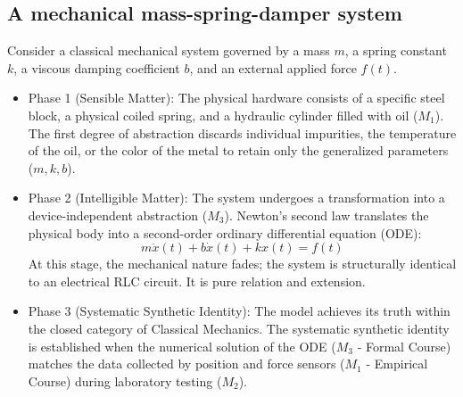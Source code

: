 \documentclass[11pt, a4paper]{article}
\begin{document}
\subsection{A mechanical mass-spring-damper system}
Consider a classical mechanical system governed by a mass $m$, a spring constant $k$, a viscous damping coefficient $b$, and an external applied force $f(t)$.
\begin{itemize}
\item \textrm{Phase 1 (Sensible Matter):} The physical hardware consists of a specific steel block, a physical coiled spring, and a hydraulic cylinder filled with oil ($M_1$). The first degree of abstraction discards individual impurities, the temperature of the oil, or the color of the metal to retain only the generalized parameters ($m, k, b$).
\item \textrm{Phase 2 (Intelligible Matter):} The system undergoes a transformation into a device-independent abstraction ($M_3$). Newton's second law translates the physical body into a second-order ordinary differential equation (ODE):
\begin{equation}
m\ddot{x}(t) + b\dot{x}(t) + kx(t) = f(t)
\end{equation}
At this stage, the mechanical nature fades; the system is structurally identical to an electrical RLC circuit. It is pure relation and extension.
\item \textrm{Phase 3 (Systematic Synthetic Identity):} The model achieves its truth within the closed category of Classical Mechanics. The systematic synthetic identity is established when the numerical solution of the ODE ($M_3$ - Formal Course) matches the data collected by position and force sensors ($M_1$ - Empirical Course) during laboratory testing ($M_2$).
\end{itemize}
\end{document}
